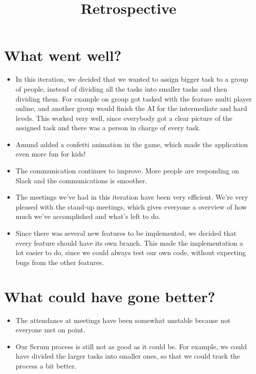 \documentclass{article}
\title{Retrospective}
\begin{document}
\date{}
\maketitle
{}
\section*{What went well?}
\begin{itemize}
\item In this iteration, we decided that we wanted to assign bigger task to a group of people, instead of dividing all the tasks into smaller tasks and then dividing them. For example on group got tasked with the feature multi player online, and another group would finish the AI for the intermediate and hard levels. This worked very well, since everybody got a clear picture of the assigned task and there was a person in charge of every task.

\item Amund added a confetti animation in the game, which made the application even more fun for kids!

\item The communication continues to improve. More people are responding on Slack and the communications is smoother.

\item The meetings we've had in this iteration have been very efficient. We're very pleased with the stand-up meetings, which gives everyone a overview of how much we've accomplished and what's left to do.

\item Since there was several new features to be implemented, we decided that every feature should have its own branch. This made the implementation a lot easier to do, since we could always test our own code, without expecting bugs from the other features.
\end{itemize}
\section*{What could have gone better?}
\begin{itemize}
\item The attendance at meetings have been somewhat unstable because not everyone met on point.
\item Our Scrum process is still not as good as it could be. For example, we could have divided the larger tasks into smaller ones, so that we could track the process a bit better.
\end{itemize}
\end{document}
